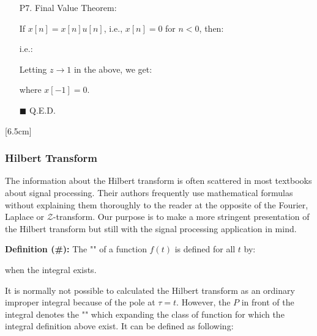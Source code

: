 \begin{enumerate}
		\item[P7.] Final Value Theorem:
		
		If $x[n]=x[n]u[n]$, i.e., $x[n]=0$ for $n<0$, then:
		
		\begin{dem}

		i.e.:
		
		Letting $z\rightarrow 1$ in the above, we get:
		
		where $x[-1]=0$.
		\begin{flushright}
			$\blacksquare$  Q.E.D.
		\end{flushright}
		\end{dem}
	\end{enumerate}
	
	
	[6.5cm]
	
	\pagebreak
	\subsubsection{Hilbert Transform}\label{hilbert transform}
	The information about the Hilbert transform is often scattered in most textbooks about signal processing. Their authors frequently use mathematical formulas without explaining them thoroughly to the reader at the opposite of the Fourier, Laplace or $\mathcal{Z}$-transform. Our purpose is to make a more stringent presentation of the Hilbert transform but still with the signal processing application in mind.
	
	\textbf{Definition (\#\mydef):} The "" of a function $f(t)$ is defined for all $t$ by:
	
	when the integral exists.
	
	It is normally not possible to calculated the Hilbert transform as an ordinary improper integral because of the pole at $\tau=t$. However, the $P$ in front of the integral denotes the "" which expanding the class of function for which the integral definition above exist. It can be defined as following:
	
